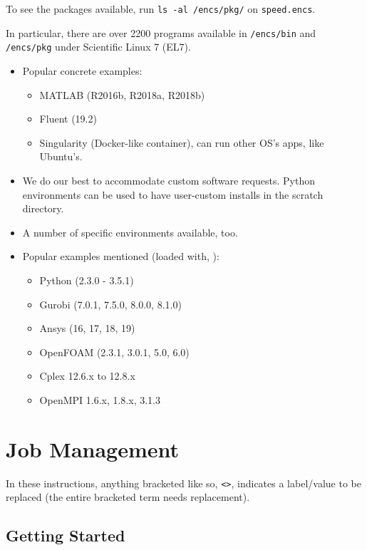\documentclass{easychair}
\begin{document}
To see the packages available, run \texttt{ls -al /encs/pkg/} on \texttt{speed.encs}.

In particular, there are over 2200 programs available in
\texttt{/encs/bin} and \texttt{/encs/pkg} under Scientific Linux 7 (EL7).

\begin{itemize}
	\item 
Popular concrete examples:
\begin{itemize}
	\item 
MATLAB (R2016b, R2018a, R2018b)
	\item 
Fluent (19.2)
	\item 
Singularity (Docker-like container), can run other OS's apps, like Ubuntu's.
\end{itemize}
	\item 
We do our best to accommodate custom software requests.
Python environments can be used to have user-custom installs
in the scratch directory.
	\item 
A number of specific environments available, too.
	\item 
Popular examples mentioned (loaded with, ):
\begin{itemize}
	\item 
Python (2.3.0 - 3.5.1)
	\item 
Gurobi (7.0.1, 7.5.0, 8.0.0, 8.1.0)
	\item 
Ansys (16, 17, 18, 19)
	\item 
OpenFOAM (2.3.1, 3.0.1, 5.0, 6.0)
	\item 
Cplex 12.6.x to 12.8.x
	\item 
OpenMPI 1.6.x, 1.8.x, 3.1.3
\end{itemize}
\end{itemize}


\section{Job Management}
\label{sect:job-management}

In these instructions, anything bracketed like so, \verb+<>+, indicates a
label/value to be replaced (the entire bracketed term needs replacement).

\subsection{Getting Started}
\end{document}
